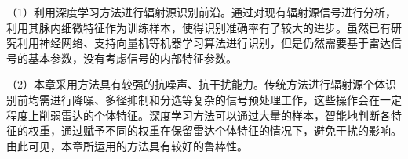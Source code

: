 （1）利用深度学习方法进行辐射源识别前沿。通过对现有辐射源信号进行分析，利用其脉内细微特征作为训练样本，使得识别准确率有了较大的进步。虽然已有研究利用神经网络、支持向量机等机器学习算法进行识别，但是仍然需要基于雷达信号的基本参数，没有考虑信号的内部特征参数。

（2）本章采用方法具有较强的抗噪声、抗干扰能力。传统方法进行辐射源个体识别前均需进行降噪、多径抑制和分选等复杂的信号预处理工作，这些操作会在一定程度上削弱雷达的个体特征。深度学习方法可以通过大量的样本，智能地判断各特征的权重，通过赋予不同的权重在保留雷达个体特征的情况下，避免干扰的影响。由此可见，本章所运用的方法具有较好的鲁棒性。


